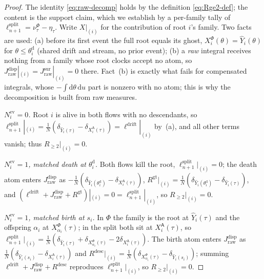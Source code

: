 \documentclass[a4paper,fleqn]{cas-sc}
\theoremstyle{definition}
\theoremstyle{remark}
\begin{document}
\begin{proof}
The identity \eqref{eq:raw-decomp} holds by the definition \eqref{eq:Rge2-def}; the
content is the support claim, which we establish by a per-family tally of
$\ell^{\mathrm{split}}_{n+1}=\nu^\Phi_\tau-\eta_\tau$. Write $X|_{(i)}$ for the
contribution of root $i$'s family. Two facts are used: (a) before its first event the
full root equals its ghost, $X^\Phi_i(\theta)=\widehat Y_i(\theta)$ for $\theta\le\theta^{\mathrm d}_i$
(shared drift and stream, no prior event); (b) a \emph{raw} integral receives nothing
from a family whose root clocks accept no atom, so
$J^{\mathrm{disp}}_{\mathrm{raw}}|_{(i)}=J^{\mathrm{sur}}_{\mathrm{raw}}|_{(i)}=0$ there.
Fact~(b) is exactly what fails for compensated integrals, whose
$-\!\int\!\mathrm d\theta\,\mathrm du$ part is nonzero with no atom; this is why the
decomposition is built from raw measures.

\emph{$N^{\mathrm{ev}}_i=0$.} Root $i$ is alive in both flows with no descendants, so
$\ell^{\mathrm{split}}_{n+1}|_{(i)}=\frac1N(\delta_{\widehat Y_i(\tau)}-\delta_{X^{\mathsf A}_i(\tau)})=\ell^{\mathrm{drift}}|_{(i)}$
by~(a), and all other terms vanish; thus $R_{\ge2}|_{(i)}=0$.

\emph{$N^{\mathrm{ev}}_i=1$, matched death at $\theta^{\mathrm d}_i$.} Both flows kill the
root, $\ell^{\mathrm{split}}_{n+1}|_{(i)}=0$; the death atom enters
$J^{\mathrm{disp}}_{\mathrm{raw}}$ as $-\frac1N(\delta_{\widehat Y_i(\theta^{\mathrm d}_i)}-\delta_{X^{\mathsf A}_i(\tau)})$,
$R^{\mathrm{gt}}|_{(i)}=\frac1N(\delta_{\widehat Y_i(\theta^{\mathrm d}_i)}-\delta_{\widehat Y_i(\tau)})$, and
$(\ell^{\mathrm{drift}}+J^{\mathrm{disp}}_{\mathrm{raw}}+R^{\mathrm{gt}})|_{(i)}=0=\ell^{\mathrm{split}}_{n+1}|_{(i)}$,
so $R_{\ge2}|_{(i)}=0$.

\emph{$N^{\mathrm{ev}}_i=1$, matched birth at $s_i$.} In $\Phi$ the family is the root at
$\widehat Y_i(\tau)$ and the offspring $\alpha_i$ at $X^\Phi_{\alpha_i}(\tau)$; in the split
both sit at $X^{\mathsf A}_i(\tau)$, so
$\ell^{\mathrm{split}}_{n+1}|_{(i)}=\frac1N(\delta_{\widehat Y_i(\tau)}+\delta_{X^\Phi_{\alpha_i}(\tau)}-2\delta_{X^{\mathsf A}_i(\tau)})$.
The birth atom enters $J^{\mathrm{disp}}_{\mathrm{raw}}$ as
$\frac1N(\delta_{\widehat Y_i(s_i)}-\delta_{X^{\mathsf A}_i(\tau)})$ and
$R^{\mathrm{desc}}|_{(i)}=\frac1N(\delta_{X^\Phi_{\alpha_i}(\tau)}-\delta_{\widehat Y_i(s_i)})$;
summing $\ell^{\mathrm{drift}}+J^{\mathrm{disp}}_{\mathrm{raw}}+R^{\mathrm{desc}}$ reproduces
$\ell^{\mathrm{split}}_{n+1}|_{(i)}$, so $R_{\ge2}|_{(i)}=0$.


\end{proof}
\end{document}
